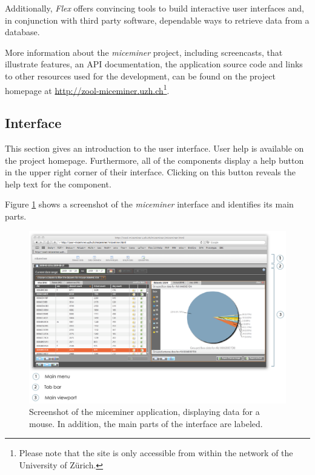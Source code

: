 Additionally, \textit{Flex} offers convincing tools to build interactive user interfaces and, in conjunction with third party software, dependable ways to retrieve data from a database. 


More information about the \textit{miceminer} project, including screencasts, that illustrate features, an \ac{API} documentation, the application source code and links to other resources used for the development, can be found on the project homepage at \href{http://zool-miceminer.uzh.ch/}{http://zool-miceminer.uzh.ch}\footnote{Please note that the site is only accessible from within the network of the University of Z\"urich.}. 

\subsection{Interface}
\label{subsec:miceminer_interface}

This section gives an introduction to the user interface. User help is available on the project homepage. Furthermore, all of the components display a help button in the upper right corner of their interface. Clicking on this button reveals the help text for the component.

Figure \ref{fig:interface_overview} shows a screenshot of the \textit{miceminer} interface and identifies its main parts.

\begin{figure}
  \includegraphics[width=\textwidth]{assets/pdf/interface_overview.pdf}
  \caption[\textit{miceminer} interface overview]{Screenshot of the miceminer application, displaying data for a mouse. In addition, the main parts of the interface are labeled.}
  \label{fig:interface_overview}
\end{figure}

